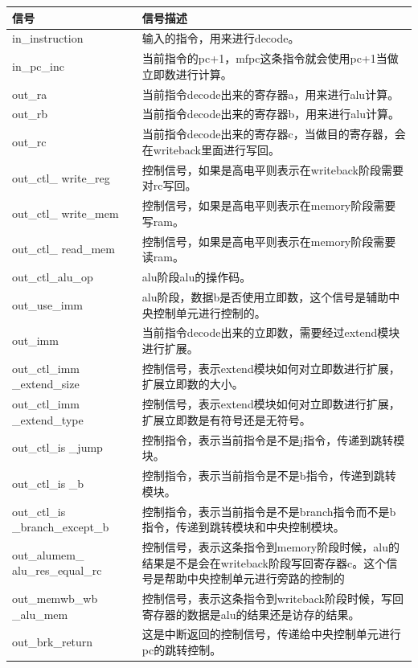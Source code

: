 \begin{center}
    \label{table:decode}
    \begin{longtable}{p{}p{}}
        \toprule
        信号 & 信号描述 \\
        \midrule
            in\_instruction & 输入的指令，用来进行decode。\\
            in\_pc\_inc & 当前指令的pc+1，mfpc这条指令就会使用pc+1当做立即数进行计算。\\
            out\_ra & 当前指令decode出来的寄存器a，用来进行alu计算。\\
            out\_rb & 当前指令decode出来的寄存器b，用来进行alu计算。\\
            out\_rc & 当前指令decode出来的寄存器c，当做目的寄存器，会在writeback里面进行写回。\\
            out\_ctl\_  write\_reg & 控制信号，如果是高电平则表示在writeback阶段需要对rc写回。\\
            out\_ctl\_  write\_mem & 控制信号，如果是高电平则表示在memory阶段需要写ram。\\
            out\_ctl\_  read\_mem & 控制信号，如果是高电平则表示在memory阶段需要读ram。\\
            out\_ctl\_alu\_op & alu阶段alu的操作码。\\
            out\_use\_imm & alu阶段，数据b是否使用立即数，这个信号是辅助中央控制单元进行控制的。\\
            out\_imm & 当前指令decode出来的立即数，需要经过extend模块进行扩展。\\
            out\_ctl\_imm  \_extend\_size & 控制信号，表示extend模块如何对立即数进行扩展，扩展立即数的大小。\\
            out\_ctl\_imm  \_extend\_type & 控制信号，表示extend模块如何对立即数进行扩展，扩展立即数是有符号还是无符号。\\
            out\_ctl\_is  \_jump & 控制指令，表示当前指令是不是j指令，传递到跳转模块。\\
            out\_ctl\_is  \_b & 控制指令，表示当前指令是不是b指令，传递到跳转模块。\\
            out\_ctl\_is  \_branch\_except\_b & 控制指令，表示当前指令是不是branch指令而不是b指令，传递到跳转模块和中央控制模块。\\
            out\_alumem\_  alu\_res\_equal\_rc & 控制信号，表示这条指令到memory阶段时候，alu的结果是不是会在writeback阶段写回寄存器c。这个信号是帮助中央控制单元进行旁路的控制的\\
            out\_memwb\_wb  \_alu\_mem & 控制信号，表示这条指令到writeback阶段时候，写回寄存器的数据是alu的结果还是访存的结果。\\
            out\_brk\_return & 这是中断返回的控制信号，传递给中央控制单元进行pc的跳转控制。\\
        \bottomrule
    \end{longtable}
\end{center}

